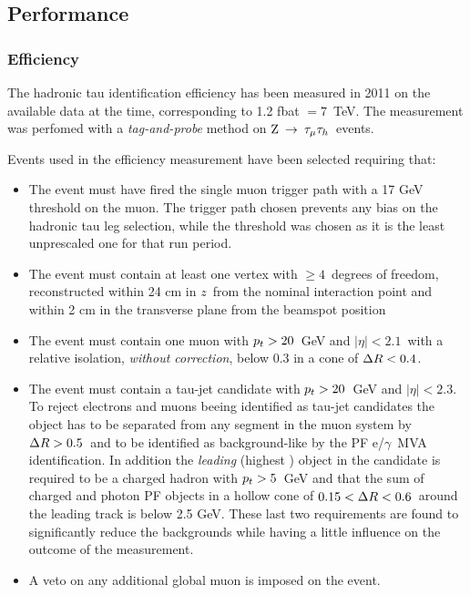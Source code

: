 \subsection{Performance}

\subsubsection*{Efficiency}
The hadronic tau identification efficiency has been measured in 2011 on the available data at the time, corresponding to 1.2 fb\Inv at \sqrts $= 7$\ TeV. The measurement was perfomed with a \emph{tag-and-probe} method on $\mathrm{Z}\:\rightarrow\:\tau_\mu\tau_h$\ events. 

Events used in the efficiency measurement have been selected requiring that:
\begin{itemize}
\item The event must have fired the single muon trigger path with a 17 GeV \pT threshold on the muon. The trigger path chosen prevents any bias on the hadronic tau leg selection, while the \pT threshold was chosen as it is the least unprescaled one for that run period.
\item The event must contain at least one vertex with $\geq 4$\ degrees of freedom, reconstructed within 24 cm in $z$\ from the nominal interaction point and within 2 cm in the transverse plane from the beamspot position
\item The event must contain one muon with $p_{t} > 20$\ GeV and $|\eta| < 2.1$\ with a relative isolation, \emph{without \db correction}, below 0.3 in a cone of $\Delta R < 0.4$.
\item The event must contain a tau-jet candidate with $p_{t} > 20$\ GeV and $|\eta| < 2.3$. To reject electrons and muons beeing identified as tau-jet candidates the object has to be separated from any segment in the muon system by $\Delta R > 0.5$\ and to be identified as background-like by the PF e/$\gamma$\ MVA identification. In addition the \emph{leading} (highest \pT) object in the candidate is required to be a charged hadron with $p_{t} > 5$\ GeV and that the \pT sum of charged and photon PF objects in a hollow cone of $0.15 < \Delta R < 0.6$\ around the leading track is below 2.5 GeV. These last two requirements are found to significantly reduce the backgrounds while having a little influence on the outcome of the measurement. 
\item A veto on any additional global muon is imposed on the event.
\end{itemize}

